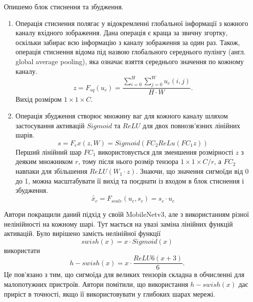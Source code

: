 Опишемо блок стиснення та збудження.
\begin{enumerate}
    \item Операція стиснення полягає у відокремленні глобальної інформації з кожного каналу
          вхідного зображення. Дана операція є краща за звичну згортку, оскільки забирає всю інформацію
          з каналу зображення за один раз. Також, операція стиснення відома під назвою глобального
          середнього пулінгу  (англ. global average pooling), яка означає взяття середнього значення 
          по кожному каналу.
          \begin{equation*}
              z = F_{sq}(u_c) = \frac{\sum_{i=0}^{H} \sum_{j=0}^{W} u_c(i,j)}{H\cdot W}.
          \end{equation*}
          Вихід розміром $1 \times 1 \times C$.
    \item Операція збудження створює множину ваг для кожного каналу шляхом застосування
          активацій $Sigmoid$ та $ReLU$ для двох повнозв'язних лінійних шарів.
          \begin{equation*}
              s = F_ex(z,W) = Sigmoid(FC_2ReLu(FC_1z))
          \end{equation*}
          Перший лінійний шар $FC_1$ використовується для зменшення розмірності $z$ з деяким
          множником $r$, тому після нього розмір тензора $1 \times 1 \times C/r$, а $FC_2$ навпаки
          для збільшення $ReLU(W_1 \cdot  z)$. Знаючи, що значення сигмоїди від 0 до 1, можна
          масштабувати її вихід та поєднати із входом в блок стиснення і збудження.
          \begin{equation*}
              \widetilde{x_c} = F_{scale}(u_c,s_c) = s_c\cdot u_c
          \end{equation*}
\end{enumerate}

Автори покращили даний підхід у своїй MobileNetv3, але з використанням
різної нелінійності на кожному шарі. Тут мається на увазі заміна лінійних функцій активацій.
Було вирішено замість нелінійної функції
\begin{equation*}
    swish(x) = x\cdot Sigmoid(x)
\end{equation*}
використати
\begin{equation*}
    h-swish(x) = x\cdot \frac{ReLU6(x + 3)}{6}.
\end{equation*}
Це пов'язано з тим, що сигмоїда для великих тензорів складна в обчисленні 
для малопотужних пристроїв. Автори помітили, 
що використання $h-swish(x)$ дає приріст в точності, якщо її
використовувати у глибоких шарах мережі.


